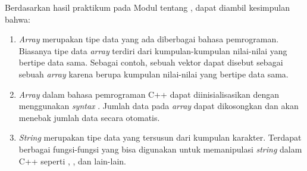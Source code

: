 \documentclass{subfiles}
\begin{document}
    \ilz{}Berdasarkan hasil praktikum pada Modul {\thechapter} tentang {\leftmark}, dapat diambil kesimpulan bahwa:
    \begin{enumerate}
        \item {
            \textit{Array} merupakan tipe data yang ada diberbagai bahasa pemrograman. Biasanya tipe data \textit{array} terdiri dari kumpulan-kumpulan nilai-nilai yang bertipe data sama. Sebagai contoh, sebuah vektor dapat disebut sebagai sebuah \textit{array} karena berupa kumpulan nilai-nilai yang bertipe data sama.
        }
        \item {
            \textit{Array} dalam bahasa pemrograman C++ dapat diinisialisasikan dengan menggunakan \textit{syntax} . Jumlah data pada \textit{array} dapat dikosongkan dan {\compiler} akan menebak jumlah data secara otomatis.
        }
        \item {
            \textit{String} merupakan tipe data yang tersusun dari kumpulan karakter. Terdapat berbagai fungsi-fungsi yang bisa digunakan untuk memanipulasi \textit{string} dalam C++ seperti , ,  dan lain-lain.
        }
    \end{enumerate}
\end{document}
